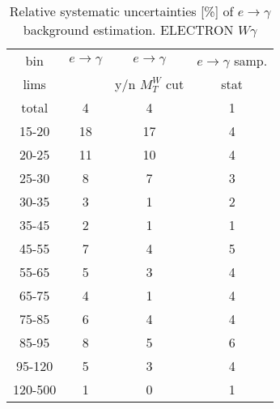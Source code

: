 \begin{table}[h]
  \scriptsize
  \begin{center}
  \caption{Relative systematic uncertainties [\%] of $e\rightarrow\gamma$ background estimation. ELECTRON $W\gamma$}
  \begin{tabular}{|c|c|c|c|}
    bin  & $e\rightarrow\gamma$ & $e\rightarrow\gamma$  & $e\rightarrow\gamma$ samp.\\
    lims  &  & y/n $M_T^W$ cut & stat\\ \hline
    total  & 4 & 4 & 1 \\ \hline
    15-20 & 18 & 17 & 4 \\ \hline
    20-25 & 11 & 10 & 4 \\ \hline
    25-30 & 8 & 7 & 3 \\ \hline
    30-35 & 3 & 1 & 2 \\ \hline
    35-45 & 2 & 1 & 1 \\ \hline
    45-55 & 7 & 4 & 5 \\ \hline
    55-65 & 5 & 3 & 4 \\ \hline
    65-75 & 4 & 1 & 4 \\ \hline
    75-85 & 6 & 4 & 4 \\ \hline
    85-95 & 8 & 5 & 6 \\ \hline
    95-120 & 5 & 3 & 4 \\ \hline
    120-500 & 1 & 0 & 1 \\ \hline
  \end{tabular}
  \label{tab:systInPercentEtogamma_ELECTRON_WGamma}
  \end{center}
\end{table}
